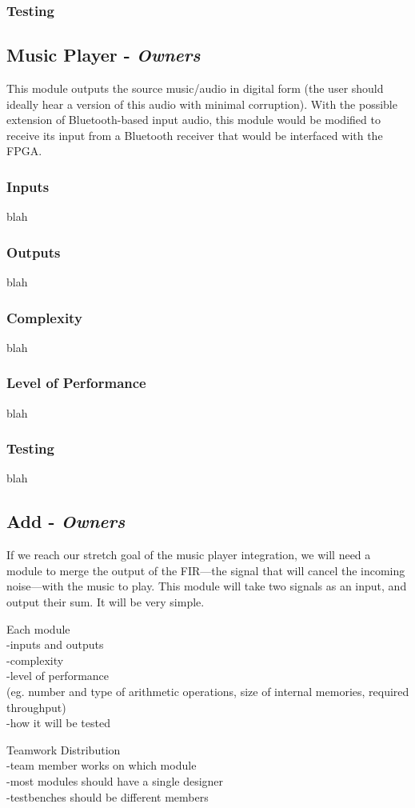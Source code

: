 \documentclass[12pt]{fpgairpods}
\begin{document}
\begin{multicols}{2}
\subsubsection{Testing}

\subsection{Music Player - \textit{Owners}}
This module outputs the source music/audio in digital form (the user should ideally hear a version of this audio with minimal corruption). With the possible extension of Bluetooth-based input audio, this module would be modified to receive its input from a Bluetooth receiver that would be interfaced with the FPGA.
\subsubsection{Inputs}
blah
\subsubsection{Outputs}
blah
\subsubsection{Complexity}
blah
\subsubsection{Level of Performance}
blah
\subsubsection{Testing}
blah

\subsection{Add - \textit{Owners}}
If we reach our stretch goal of the music player integration, we will need a module to merge the output of the FIR---the signal that will cancel the incoming noise---with the music to play. This module will take two signals as an input, and output their sum. It will be very simple.

\end{multicols}
Each module
\\-inputs and outputs
\\-complexity
\\-level of performance
\\(eg. number and type of arithmetic operations, size of internal memories, required throughput)
\\-how it will be tested

Teamwork Distribution
\\-team member works on which module 
\\-most modules should have a single designer
\\-testbenches should be different members

\printbibliography
\end{document}
